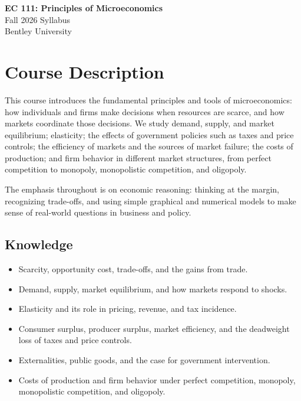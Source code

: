 \documentclass[11pt,letterpaper]{article}
\begin{document}
\begin{center}
{\LARGE\bfseries\color{bentleyblue} EC 111: Principles of Microeconomics}\\[0.3cm]
{\Large Fall 2026 Syllabus}\\[0.5cm]
{\large Bentley University}
\end{center}

\vspace{0.5cm}

\section*{Course Description}

This course introduces the fundamental principles and tools of microeconomics: how individuals and firms make decisions when resources are scarce, and how markets coordinate those decisions. We study demand, supply, and market equilibrium; elasticity; the effects of government policies such as taxes and price controls; the efficiency of markets and the sources of market failure; the costs of production; and firm behavior in different market structures, from perfect competition to monopoly, monopolistic competition, and oligopoly.

The emphasis throughout is on economic reasoning: thinking at the margin, recognizing trade-offs, and using simple graphical and numerical models to make sense of real-world questions in business and policy.

\subsection*{Knowledge}
\begin{itemize}
    \item Scarcity, opportunity cost, trade-offs, and the gains from trade.
    \item Demand, supply, market equilibrium, and how markets respond to shocks.
    \item Elasticity and its role in pricing, revenue, and tax incidence.
    \item Consumer surplus, producer surplus, market efficiency, and the deadweight loss of taxes and price controls.
    \item Externalities, public goods, and the case for government intervention.
    \item Costs of production and firm behavior under perfect competition, monopoly, monopolistic competition, and oligopoly.
\end{itemize}
\end{document}
